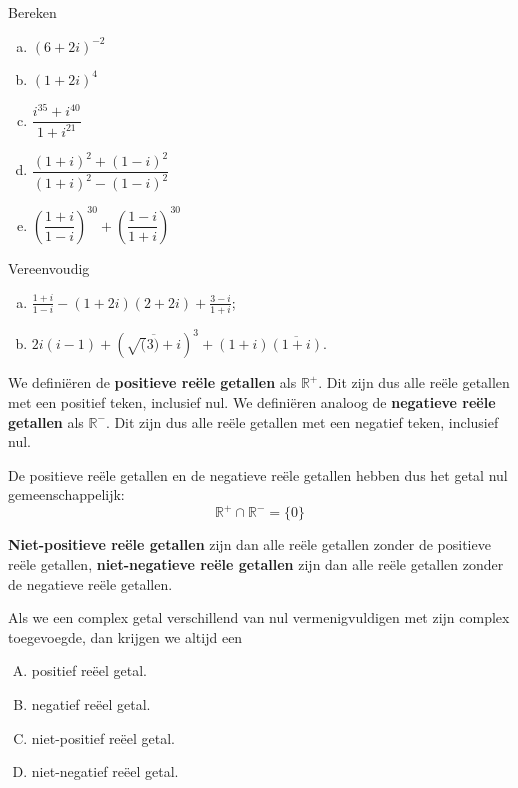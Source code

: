 \documentclass[12pt,twoside]{article}
\begin{document}
\begin{oefening}
  Bereken
  \begin{enumerate}[(a)]
    \itemsep1em
  \item $\displaystyle \left(6+2i\right)^{-2}$
  \item $\displaystyle \left(1+2i\right)^4$
  \item $\displaystyle \dfrac{i^{35}+i^{40}}{1+i^{21}}$
  \item $\displaystyle \dfrac{(1+i)^2+(1-i)^2}{(1+i)^2-(1-i)^2}$
  \item $\displaystyle \left(\dfrac{1+i}{1-i}\right)^{30}+\left(\dfrac{1-i}{1+i}\right)^{30}$
  \end{enumerate}
\end{oefening}

\begin{oefening}
  Vereenvoudig
  \begin{enumerate}[(a)]
    \itemsep 1em
  \item $\frac{1+i}{1-i}-(1+2i)(2+2i)+\frac{3-i}{1+i}$;
  \item $2i(i-1)+\left(\overline{\sqrt(3)+i}\right)^3+(1+i)\overline{(1+i)}.$
  \end{enumerate}
\end{oefening}

\begin{oefening}
  We definiëren de {\bf positieve reële getallen} als $\mathbb{R}^+$. Dit zijn dus alle reële getallen met een positief teken, inclusief nul. We definiëren analoog de {\bf negatieve reële getallen} als $\mathbb{R}^-$. Dit zijn dus alle reële getallen met een negatief teken, inclusief nul.

  De positieve reële getallen en de negatieve reële getallen hebben dus het getal nul gemeenschappelijk:
  $$\mathbb{R}^+\cap\mathbb{R}^-=\{0\}$$

  {\bf Niet-positieve reële getallen} zijn dan alle reële getallen zonder de positieve reële getallen, {\bf niet-negatieve reële getallen} zijn dan alle reële getallen zonder de negatieve reële getallen.

  Als we een complex getal verschillend van nul vermenigvuldigen met zijn complex toegevoegde, dan krijgen we altijd een
  \begin{enumerate}[(A)]
  \item positief reëel getal.
  \item negatief reëel getal.
  \item niet-positief reëel getal.
  \item niet-negatief reëel getal.
  \end{enumerate}
\end{oefening}
\end{document}
